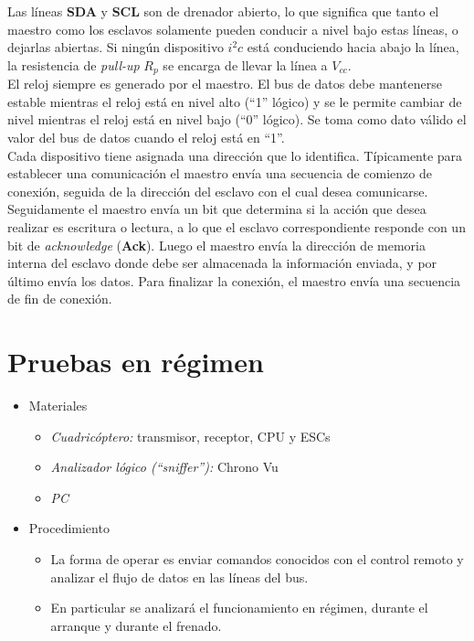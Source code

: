 \documentclass[main]{subfiles}
\begin{document}
Las l\'ineas \textbf{SDA} y \textbf{SCL} son de drenador abierto, lo que significa que tanto el maestro como los esclavos solamente pueden conducir a nivel bajo estas l\'ineas, o dejarlas abiertas. Si ning\'un dispositivo $i^2c$ est\'a conduciendo hacia abajo la l\'inea, la resistencia de \emph{pull-up} $R_p$ se encarga de llevar la l\'inea a $V_{cc}$.\\

El reloj siempre es generado por el maestro. El bus de datos debe mantenerse estable mientras el reloj está en nivel alto (``1'' lógico) y se le permite cambiar de nivel mientras el reloj está en nivel bajo (``0'' lógico). Se toma como dato válido el valor del bus de datos cuando el reloj está en ``1''.\\

Cada dispositivo tiene asignada una direcci\'on que lo identifica. Típicamente para establecer una comunicaci\'on el maestro env\'ia una secuencia de comienzo de conexi\'on, seguida de la direcci\'on del esclavo con el cual desea comunicarse. Seguidamente el maestro env\'ia un bit que determina si la acci\'on que desea realizar es escritura o lectura, a lo que el esclavo correspondiente responde con un bit de \emph{acknowledge} (\textbf{Ack}). Luego el maestro env\'ia la direcci\'on de memoria interna del esclavo donde debe ser almacenada la informaci\'on enviada, y por \'ultimo env\'ia los datos. Para finalizar la conexi\'on, el maestro env\'ia una secuencia de fin de conexi\'on.

\section{Pruebas en r\'egimen}

\begin{itemize}
	\item Materiales
	\begin{itemize}
		\item \emph{Cuadricóptero:} transmisor, receptor, CPU y ESCs
		\item \emph{Analizador lógico (``sniffer''):} Chrono Vu
		\item \emph{PC}
	\end{itemize}
	\item Procedimiento
	\begin{itemize}
		\item La forma de operar es enviar comandos conocidos con el control remoto y analizar el flujo de datos en las l\'ineas del bus.
		\item En particular se analizará el funcionamiento en régimen, durante el arranque y durante el frenado.
	\end{itemize}
\end{itemize}
\end{document}
